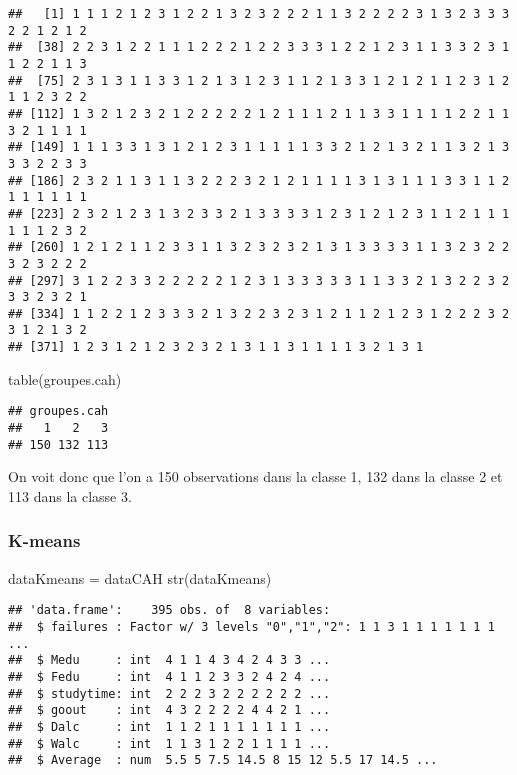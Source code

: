 \documentclass[
]{article}
\newenvironment{Shaded}{\begin{snugshade}}{\end{snugshade}}
\newcommand{\FunctionTok}[1]{\textcolor[rgb]{0.00,0.00,0.00}{#1}}
\newcommand{\NormalTok}[1]{#1}
\newcommand{\OtherTok}[1]{\textcolor[rgb]{0.56,0.35,0.01}{#1}}
\begin{document}
\begin{verbatim}
##   [1] 1 1 1 2 1 2 3 1 2 2 1 3 2 3 2 2 2 1 1 3 2 2 2 2 3 1 3 2 3 3 3 2 2 1 2 1 2
##  [38] 2 2 3 1 2 2 1 1 1 2 2 2 1 2 2 3 3 3 1 2 2 1 2 3 1 1 3 3 2 3 1 1 2 2 1 1 3
##  [75] 2 3 1 3 1 1 3 3 1 2 1 3 1 2 3 1 1 2 1 3 3 1 2 1 2 1 1 2 3 1 2 1 1 2 3 2 2
## [112] 1 3 2 1 2 3 2 1 2 2 2 2 2 1 2 1 1 1 2 1 1 3 3 1 1 1 1 2 2 1 1 3 2 1 1 1 1
## [149] 1 1 1 3 3 1 3 1 2 1 2 3 1 1 1 1 1 3 3 2 1 2 1 3 2 1 1 3 2 1 3 3 3 2 2 3 3
## [186] 2 3 2 1 1 3 1 1 3 2 2 2 3 2 1 2 1 1 1 1 3 1 3 1 1 1 3 3 1 1 2 1 1 1 1 1 1
## [223] 2 3 2 1 2 3 1 3 2 3 3 2 1 3 3 3 3 1 2 3 1 2 1 2 3 1 1 2 1 1 1 1 1 1 2 3 2
## [260] 1 2 1 2 1 1 2 3 3 1 1 3 2 3 2 3 2 1 3 1 3 3 3 3 1 1 3 2 3 2 2 3 2 3 2 2 2
## [297] 3 1 2 2 3 3 2 2 2 2 2 1 2 3 1 3 3 3 3 3 1 1 3 3 2 1 3 2 2 3 2 3 3 2 3 2 1
## [334] 1 1 2 2 1 2 3 3 3 2 1 3 2 2 3 2 3 1 2 1 1 2 1 2 3 1 2 2 2 3 2 3 1 2 1 3 2
## [371] 1 2 3 1 2 1 2 3 2 3 2 1 3 1 1 3 1 1 1 1 3 2 1 3 1
\end{verbatim}

\begin{Shaded}
\begin{Highlighting}[]
\FunctionTok{table}\NormalTok{(groupes.cah)}
\end{Highlighting}
\end{Shaded}

\begin{verbatim}
## groupes.cah
##   1   2   3 
## 150 132 113
\end{verbatim}

On voit donc que l'on a 150 observations dans la classe 1, 132 dans la
classe 2 et 113 dans la classe 3.

\hypertarget{k-means}{%
\subsubsection{K-means}\label{k-means}}

\begin{Shaded}
\begin{Highlighting}[]
\NormalTok{dataKmeans }\OtherTok{=}\NormalTok{ dataCAH}
\FunctionTok{str}\NormalTok{(dataKmeans)}
\end{Highlighting}
\end{Shaded}

\begin{verbatim}
## 'data.frame':    395 obs. of  8 variables:
##  $ failures : Factor w/ 3 levels "0","1","2": 1 1 3 1 1 1 1 1 1 1 ...
##  $ Medu     : int  4 1 1 4 3 4 2 4 3 3 ...
##  $ Fedu     : int  4 1 1 2 3 3 2 4 2 4 ...
##  $ studytime: int  2 2 2 3 2 2 2 2 2 2 ...
##  $ goout    : int  4 3 2 2 2 2 4 4 2 1 ...
##  $ Dalc     : int  1 1 2 1 1 1 1 1 1 1 ...
##  $ Walc     : int  1 1 3 1 2 2 1 1 1 1 ...
##  $ Average  : num  5.5 5 7.5 14.5 8 15 12 5.5 17 14.5 ...
\end{verbatim}
\end{document}
